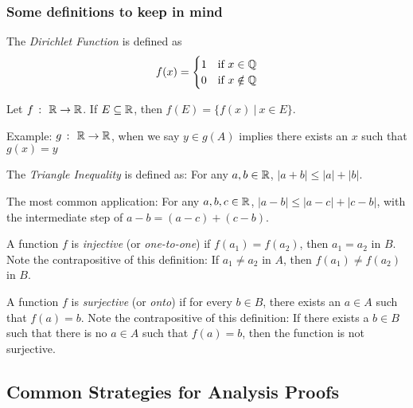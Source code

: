 \subsubsection{Some definitions to keep in mind}


\begin{definition}
    The \textit{Dirichlet Function} is defined as \[f(x) = \begin{cases} 1 & \text{if } x \in \mathbb{Q} \\ 0 & \text{if } x \notin \mathbb{Q} \end{cases}\]
\end{definition}

\begin{definition}
    Let \(f \ \colon \ \mathbb{R} \rightarrow \mathbb{R}\). If \(E \subseteq \mathbb{R}\), then \(f(E) = \{f(x) \ | \ x \in E\}\).
\end{definition}

Example: \(g \ \colon \ \mathbb{R} \rightarrow \mathbb{R}\), when we say \(y \in g(A)\) implies there exists an \(x\) such that \(g(x) = y\) \\

\hypertarget{Triangle Inequality}{}
\begin{definition}
    The \textit{Triangle Inequality} is defined as: For any \(a,b \in \mathbb{R}\), \(|a + b| \leq  |a| + |b|\).
\end{definition}
The most common application: For any \(a,b,c \in \mathbb{R}\), \(|a - b| \leq |a-c| + |c-b|\), with the intermediate step of \(a - b = (a-c) + (c-b)\).

\begin{definition}
    A function \(f\) is \textit{injective} (or \textit{one-to-one}) if \(f(a_1) = f(a_2)\), then \(a_1 = a_2\) in \(B\). Note the contrapositive of this definition: If \(a_1 \ne a_2\) in \(A\), then \(f(a_1) \ne f(a_2)\) in \(B\).
\end{definition}

\begin{definition}
    A function \(f\) is \textit{surjective} (or \textit{onto}) if for every \(b \in B\), there exists an \(a \in A\) such that \(f(a) = b\). Note the contrapositive of this definition: If there exists a \(b \in B\) such that there is no \(a \in A\) such that \(f(a) = b\), then the function is not surjective.
\end{definition}

\subsection{Common Strategies for Analysis Proofs}

